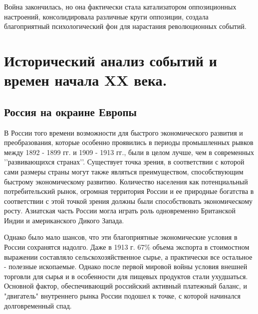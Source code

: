 \documentclass[12pt]{article}
\begin{document}
Война закончилась, но она фактически стала катализатором оппозиционных настроений, консолидировала различные круги оппозиции, создала благоприятный психологический фон для нарастания революционных событий.
\newpage

\section{ Исторический анализ событий и времен начала XX века.}

\subsection{ Россия на окраине Европы}

В России того времени возможности для быстрого экономического развития и преобразования, которые особенно проявились в периоды промышленных рывков между 1892 - 1899 гг. и 1909 - 1913 гг., были в целом лучше, чем в современных \rq\rq{}развивающихся странах\rq\rq{}. Существует точка зрения, в соответствии с которой сами размеры страны могут также являться преимуществом, способствующим быстрому экономическому развитию. Количество населения как потенциальный потребительский рынок, огромная территория России и ее природные богатства в соответствии с этой точкой зрения должны были способствовать экономическому росту. Азиатская часть России могла играть роль одновременно Британской Индии и американского Дикого Запада.

Однако было мало шансов, что эти благоприятные экономические условия в России сохранятся надолго. Даже в 1913 г. 67\% объема экспорта в стоимостном выражении составляло сельскохозяйственное сырье, а практически все остальное - полезные ископаемые. Однако после первой мировой войны условия внешней торговли для сырья и в особенности для пищевых продуктов стали ухудшаться. Основной фактор, обеспечивающий российский активный платежный баланс, и "двигатель" внутреннего рынка России подошел к точке, с которой начинался долговременный спад.
\end{document}
